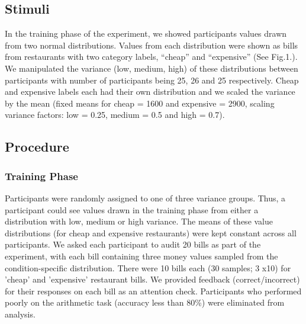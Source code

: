 \documentclass[10pt,letterpaper]{article}
\begin{document}
\subsection{Stimuli}

In the training phase of the experiment, we showed participants values drawn from two normal distributions. Values from each distribution were shown as bills from restaurants with two category labels, “cheap” and “expensive” (See Fig.1.). We manipulated the variance (low, medium, high) of these distributions between participants with number of participants being 25, 26 and 25 respectively. Cheap and expensive labels each had their own distribution and we scaled the variance by the mean (fixed means for cheap = 1600 and expensive = 2900, scaling variance factors: low = 0.25, medium = 0.5 and high = 0.7).  


\subsection{Procedure}
	
\subsubsection{Training Phase}
	
Participants were randomly assigned to one of three variance groups. Thus, a participant could see values drawn in the training phase from either a distribution with low, medium or high variance. The means of these value distributions (for cheap and expensive restaurants) were kept constant across all participants. We asked each participant to audit 20 bills as part of the experiment, with each bill containing three money values sampled from the condition-specific distribution. There were 10 bills each (30 samples; 3 x10) for 'cheap' and 'expensive' restaurant bills. We provided feedback (correct/incorrect) for their responses on each bill as an attention check. Participants who performed poorly on the arithmetic task (accuracy less than 80\%) were eliminated from analysis. 
\end{document}

